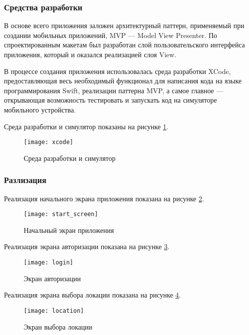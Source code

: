 \subsubsection{Средства разработки}

В основе всего приложения заложен архитектурный паттерн, применяемый при создании мобильных приложений, MVP --- Model View Presenter. По спроектированным макетам был разработан слой пользовательского интерфейса приложения, который и оказался реализацией слоя View.

В процессе создания приложения использовалась среда разработки XCode\cite{xcode}, предоставляющая весь необходимый функционал для написания кода на языке программирования Swift, реализации паттерна MVP, а самое главное --- открывающая возможность тестировать и запускать код на симуляторе мобильного устройства. 

Среда разработки и симулятор показаны на рисунке \ref{xcode}.

\begin{figure}[H]
	\centering
	\texttt{[image: xcode]}
	\caption{Среда разработки и симулятор }
	\label{xcode}
\end{figure}

\subsubsection{Разлизация}

Реализация начального экрана приложения показана на рисунке \ref{start_screen}.

\begin{figure}[H]
	\centering
	\texttt{[image: start\_screen]}
	\caption{Начальный экран приложения}
	\label{start_screen}
\end{figure}

Реализация экрана авторизации показана на рисунке \ref{login}.

\begin{figure}[H]
	\centering
	\texttt{[image: login]}
	\caption{Экран авторизации}
	\label{login}
\end{figure}

Реализация экрана выбора локации показана на рисунке \ref{location}.

\begin{figure}[H]
	\centering
	\texttt{[image: location]}
	\caption{Экран выбора локации}
	\label{location}
\end{figure}

